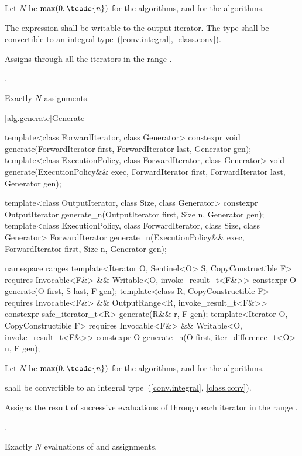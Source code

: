 \begin{itemdescr}
\pnum
Let $N$ be $\max(0, \tcode{n})$ for the  algorithms, and
 for the  algorithms.

\pnum
\requires
The expression 
shall be writable to the output iterator.
The type  shall be convertible
to an integral type~(\ref{conv.integral}, \ref{class.conv}).

\pnum
\effects
Assigns 
through all the iterators in the range .

\pnum
\returns
{}.

\pnum
\complexity
Exactly $N$ assignments.
\end{itemdescr}

[alg.generate]{Generate}

%
%
\begin{itemdecl}
template<class ForwardIterator, class Generator>
  constexpr void generate(ForwardIterator first, ForwardIterator last,
                          Generator gen);
template<class ExecutionPolicy, class ForwardIterator, class Generator>
  void generate(ExecutionPolicy&& exec,
                ForwardIterator first, ForwardIterator last,
                Generator gen);

template<class OutputIterator, class Size, class Generator>
  constexpr OutputIterator generate_n(OutputIterator first, Size n, Generator gen);
template<class ExecutionPolicy, class ForwardIterator, class Size, class Generator>
  ForwardIterator generate_n(ExecutionPolicy&& exec,
                             ForwardIterator first, Size n, Generator gen);

namespace ranges {
  template<Iterator O, Sentinel<O> S, CopyConstructible F>
    requires Invocable<F&> && Writable<O, invoke_result_t<F&>>
    constexpr O generate(O first, S last, F gen);
  template<class R, CopyConstructible F>
    requires Invocable<F&> && OutputRange<R, invoke_result_t<F&>>
    constexpr safe_iterator_t<R> generate(R&& r, F gen);
  template<Iterator O, CopyConstructible F>
    requires Invocable<F&> && Writable<O, invoke_result_t<F&>>
    constexpr O generate_n(O first, iter_difference_t<O> n, F gen);
}
\end{itemdecl}

\begin{itemdescr}
\pnum
Let $N$ be $\max(0, \tcode{n})$ for the  algorithms, and
 for the  algorithms.

\pnum
\requires
{} shall be convertible
to an integral type~(\ref{conv.integral}, \ref{class.conv}).

\pnum
\effects
Assigns the result of successive evaluations of 
through each iterator in the range .

\pnum
\returns
{}.

\pnum
\complexity
Exactly $N$ evaluations of  and assignments.
\end{itemdescr}

